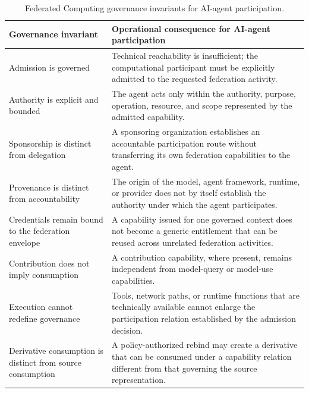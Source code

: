 \documentclass[twoside,11pt]{article}
\begin{document}
\begin{table}[htbp]
\centering
\caption{Federated Computing governance invariants for AI-agent participation.}
\label{tab:agent-governance-invariants}

\begin{tabularx}{\textwidth}{
    >{\raggedright\arraybackslash}p{4.2cm}
    >{\raggedright\arraybackslash}X
}
\toprule
\textbf{Governance invariant} &
\textbf{Operational consequence for AI-agent participation} \\
\midrule

Admission is governed
&
Technical reachability is insufficient; the computational participant must be explicitly admitted to the requested federation activity.
\\

\addlinespace

Authority is explicit and bounded
&
The agent acts only within the authority, purpose, operation, resource, and scope represented by the admitted capability.
\\

\addlinespace

Sponsorship is distinct from delegation
&
A sponsoring organization establishes an accountable participation route without transferring its own federation capabilities to the agent.
\\

\addlinespace

Provenance is distinct from accountability
&
The origin of the model, agent framework, runtime, or provider does not by itself establish the authority under which the agent participates.
\\

\addlinespace

Credentials remain bound to the federation envelope
&
A capability issued for one governed context does not become a generic entitlement that can be reused across unrelated federation activities.
\\

\addlinespace

Contribution does not imply consumption
&
A contribution capability, where present, remains independent from model-query or model-use capabilities.
\\

\addlinespace

Execution cannot redefine governance
&
Tools, network paths, or runtime functions that are technically available cannot enlarge the participation relation established by the admission decision.
\\
\addlinespace
Derivative consumption is distinct from source consumption
&
A policy-authorized rebind may create a derivative that can be consumed under a capability relation different from that governing the source representation.
\\

\bottomrule
\end{tabularx}

\end{table}
\end{document}
